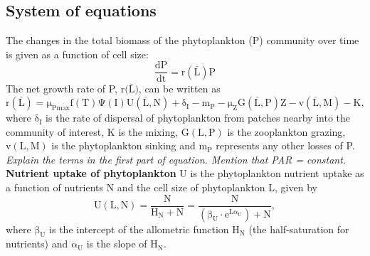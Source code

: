 \subsection{System of equations}
The changes in the total biomass of the phytoplankton (P) community over time is given as a function of cell size:
\begin{equation}
    \label{eq:phytoplanktonbiomass}
    \mathrm{\frac{dP}{dt} = r(\bar{L})P}
\end{equation}
The net growth rate of P, $\mathrm{r(\bar{L}})$, can be written as
\begin{equation}
    \label{eq:netgrowthrateP}
    \mathrm{r(\bar{L})=\mu_{Pmax}f(T)\Psi(I)U(\bar{L},N)+\delta_I-m_P-\mu_ZG(\bar{L},P)Z-v(\bar{L},M)-K},
\end{equation}
where $\mathrm{\delta_I}$ is the rate of dispersal of phytoplankton from patches nearby into the community of interest, K is the mixing, $\mathrm{G(L,P)}$ is the zooplankton grazing, $\mathrm{v(L,M)}$ is the phytoplankton sinking and $\mathrm{m_P}$ represents any other losses of P. \textit{Explain the terms in the first part of equation. Mention that PAR = constant.}
\newline
\newline
\textbf{Nutrient uptake of phytoplankton}
\newline
U is the phytoplankton nutrient uptake as a function of nutrients N and the cell size of phytoplankton L, given by
\begin{equation}
    \label{eq:nutrientuptake}
    \mathrm{U(L,N) = \frac{N}{H_N+N}=\frac{N}{(\beta_U\cdot e^{L\alpha_U})+N}},
\end{equation}
where $\mathrm{\beta_U}$ is the intercept of the allometric function $\mathrm{H_N}$ (the half-saturation for nutrients) and $\mathrm{\alpha_U}$ is the slope of $\mathrm{H_N}$.
